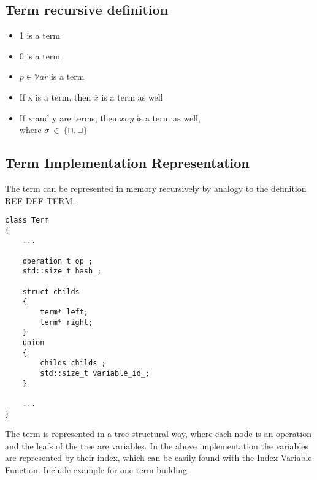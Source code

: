 \documentclass{article}
\begin{document}
		\subsection*{Term recursive definition}
		\begin{itemize}
			\item 1 is a term
			\item 0 is a term
			\item $p \in \mathbb{V}ar$ is a term
			\item If x is a term, then $\bar{x}$ is a term as well
			\item If x and y are terms, then $x \sigma y $ is a term as well,\\
				where $\sigma \: \in \: \{\sqcap, \sqcup\}$
		\end{itemize}	

		\subsection*{Term Implementation Representation}
			The term can be represented in memory recursively by analogy to the definition REF-DEF-TERM.

		\begin{lstlisting}
class Term 
{
	...

	operation_t op_;
	std::size_t hash_;
	
	struct childs
	{
		term* left;
		term* right;
	}
	union 
	{
		childs childs_;
		std::size_t variable_id_;
	}

	...
}
		\end{lstlisting}
		The term is represented in a tree structural way, where each node is an operation and the leafs of the tree
		are variables. In the above implementation the variables are represented by their index, which can be 
		easily found with the Index Variable Function.
		\newline
		\newline
		Include example for one term building
		\newline
		\newline
\end{document}

